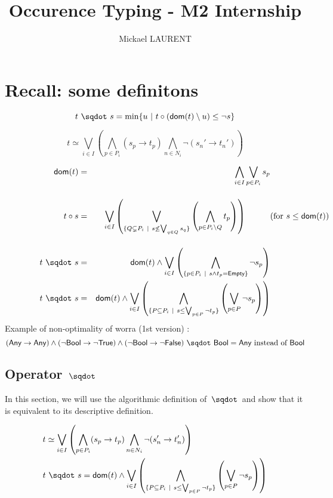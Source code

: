 \documentclass[a4paper]{article}%
\title{\vspace{1.5cm}Occurence Typing - M2 Internship}
\author{Mickael LAURENT}
\date{\vspace{-5ex}}
\begin{document}
    \maketitle

    \section{Recall: some definitons}

    \[ \worra t s = \min \{ u \alt \apply t {(\dom t \setminus u)} \leq \neg s \} \]

    \[ t \simeq \bigvee_{i\in I}\left(\bigwedge_{p\in P_i}(s_p\to t_p)\bigwedge_{n\in N_i}\neg(s_n'\to t_n')\right) \]

    \begin{eqnarray*}
        \dom{t}    & = & \bigwedge_{i\in I}\bigvee_{p\in P_i}s_p\\[4mm]
        \apply t s & = & \bigvee_{i\in I}\left(\bigvee_{\{Q\subsetneq P_i\alt s\not\leq\bigvee_{q\in Q}s_q\}}\left(\bigwedge_{p\in P_i\setminus Q}t_p\right)\right)\hspace*{1cm}\makebox[0cm][l]{(for $s\leq\dom{t}$)}\\[4mm]
        \worra t s & = & \dom t \wedge\bigvee_{i\in I}\left(\bigwedge_{\{p\in P_i\alt s\wedge t_p=\Empty\}}\neg s_p \right)\\
        \worra t s & = & \dom t \wedge\bigvee_{i\in I}\left(\bigwedge_{\{P \subseteq P_i\alt s \leq \bigvee_{p \in P} \neg t_p\}} \left(\bigvee_{p \in P} \neg s_p \right)\right)
    \end{eqnarray*}
    Example of non-optimality of worra (1st version) :
    \[ \worra {(\Any \rightarrow \Any) \land (\neg \Bool \rightarrow \neg \True) \land (\neg \Bool \rightarrow \neg \False)} \Bool = \Any \text{ instead of } \Bool \]
    \pagebreak

    \subsection{Operator $\worra {} {}$}

    In this section, we will use the algorithmic definition of $\worra {} {}$ and show that it is equivalent to its
    descriptive definition.

    \begin{eqnarray*}
        &t \simeq \bigvee_{i\in I}\left(\bigwedge_{p\in P_i}(s_p\to t_p)\bigwedge_{n\in N_i}\neg(s_n'\to t_n')\right)\\
        &\worra t s = \dom t \wedge\bigvee_{i\in I}\left(\bigwedge_{\{P \subseteq P_i\alt s \leq \bigvee_{p \in P} \neg t_p\}} \left(\bigvee_{p \in P} \neg s_p \right)\right)
    \end{eqnarray*}
\end{document}

